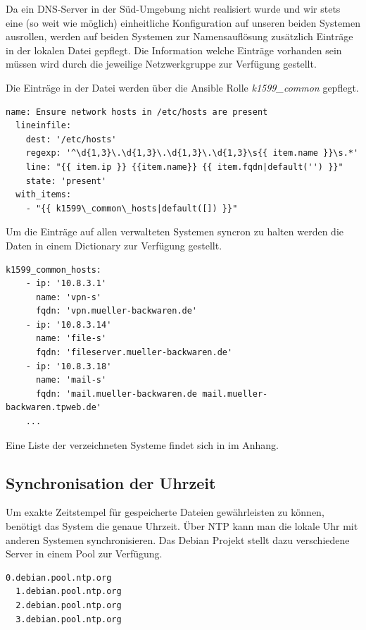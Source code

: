 Da ein DNS-Server in der Süd-Umgebung nicht realisiert wurde und wir stets eine (so weit wie möglich) einheitliche Konfiguration auf unseren beiden Systemen ausrollen, werden auf beiden Systemen zur Namensauflösung zusätzlich Einträge in der lokalen  Datei gepflegt. Die Information welche Einträge vorhanden sein müssen wird durch die jeweilige Netzwerkgruppe zur Verfügung gestellt.

Die Einträge in der Datei  werden über die Ansible Rolle \textit{k1599\_common} gepflegt.

\begin{lstlisting}[label=code:denyany,caption=Auszug aus ansible/roles/k1599\_common/tasks/main.yml]
  name: Ensure network hosts in /etc/hosts are present
  lineinfile:
    dest: '/etc/hosts'
    regexp: '^\d{1,3}\.\d{1,3}\.\d{1,3}\.\d{1,3}\s{{ item.name }}\s.*'
    line: "{{ item.ip }} {{item.name}} {{ item.fqdn|default('') }}"
    state: 'present'
  with_items:
    - "{{ k1599\_common\_hosts|default([]) }}"
\end{lstlisting}

Um die Einträge auf allen verwalteten Systemen syncron zu halten werden die Daten in einem Dictionary zur Verfügung gestellt.

\begin{lstlisting}[label=code:denyany,caption=Auszug aus ansible/group\_vars/all]
  k1599_common_hosts:
    - ip: '10.8.3.1'
      name: 'vpn-s'
      fqdn: 'vpn.mueller-backwaren.de'
    - ip: '10.8.3.14'
      name: 'file-s'
      fqdn: 'fileserver.mueller-backwaren.de'
    - ip: '10.8.3.18'
      name: 'mail-s'
      fqdn: 'mail.mueller-backwaren.de mail.mueller-backwaren.tpweb.de'
    ...
\end{lstlisting}

Eine Liste der verzeichneten Systeme findet sich in im Anhang.

\subsection{Synchronisation der Uhrzeit}
Um exakte Zeitstempel für gespeicherte Dateien gewährleisten zu können, benötigt das System die genaue Uhrzeit. Über NTP kann man die lokale Uhr mit anderen Systemen synchronisieren. Das Debian Projekt stellt dazu verschiedene Server in einem Pool zur Verfügung. 

\begin{lstlisting}[label=code:ntp,caption=Debian NTP Server]
  0.debian.pool.ntp.org
  1.debian.pool.ntp.org
  2.debian.pool.ntp.org
  3.debian.pool.ntp.org
\end{lstlisting}

